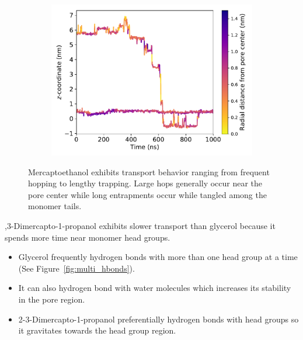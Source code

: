 \documentclass{article}
\begin{document}
  \begin{figure}
  \centering
  \begin{subfigure}{0.45\textwidth}
  \includegraphics[width=\linewidth]{SOH_trace.pdf}
  \caption{}\label{fig:SOH_trace}
  \end{subfigure}
  \caption{Mercaptoethanol exhibits transport behavior ranging from frequent hopping
  to lengthy trapping. Large hops generally occur near the pore center while 
  long entrapments occur while tangled among the monomer tails.}
  \end{figure}
  
  
  ,3-Dimercapto-1-propanol exhibits slower transport than glycerol because it spends more time
  near monomer head groups. %
  \begin{itemize}
    \item Glycerol frequently hydrogen bonds with more than one head group at a time (See Figure~\ref{fig:multi_hbonds}).
    \item It can also hydrogen bond with water molecules which increases its stability
    in the pore region.
    \item 2-3-Dimercapto-1-propanol preferentially hydrogen bonds with head groups 
    so it gravitates towards the head group region.
  \end{itemize} 
  
\end{document}
